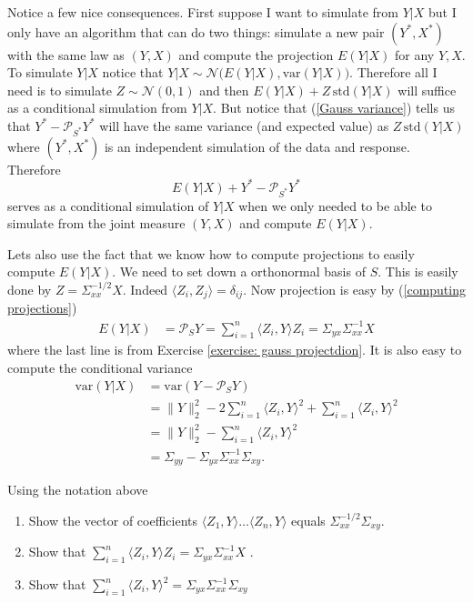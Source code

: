 Notice a few nice consequences. First suppose I want to simulate from $Y|X$ but I only have an algorithm that can do two things: simulate a new pair $(Y^*, X^*)$ with the same law as $(Y,X)$ and compute the projection $E(Y|X)$ for any $Y, X$. To simulate $Y|X$ notice that $Y|X\sim \mathcal N\bigl( E( Y|X), \text{var}(Y|X)\bigr)$. Therefore all I need is to simulate $ Z \sim \mathcal N(0,1)$ and then $E( Y|X) + Z\, \text{std}(Y|X)$ will suffice as a conditional simulation from $Y|X$. But notice that (\ref{Gauss variance}) tells us that $Y^* - \mathcal P_{S^*} Y^*$
 will have the same variance (and expected value) as $Z\, \text{std}(Y|X)$ where $(Y^*, X^*)$ is an independent simulation of the data and response. Therefore
 \[ E(Y|X) + Y^* - \mathcal P_{S^*} Y^*\]
 serves as a conditional simulation of $Y|X$ when we only needed to be able to simulate from the joint measure $(Y, X)$ and compute $E(Y|X)$.

 Lets also use the fact that we know how to compute projections to easily compute $E(Y|X)$. We need to set down a orthonormal basis of $S$. This is easily done by $Z = \Sigma_{xx}^{-1/2} X$. Indeed $\langle Z_i, Z_j\rangle = \delta_{ij}$. Now projection is easy by (\ref{computing projections})
 \begin{align*}
 E(Y|X) &= \mathcal P_SY = \sum_{i=1}^n \langle Z_i, Y\rangle Z_i = \Sigma_{yx} \Sigma_{xx}^{-1} X
 \end{align*}
 where the last line is from Exercise \ref{exercise: gauss projectdion}. It is also easy to compute the conditional variance
\begin{align*}
\text{var}(Y |X) &= \text{var}(Y -\mathcal P_S Y) \\
&= \| Y \|^2_2 - 2\sum_{i=1}^n \langle Z_i, Y\rangle^2 +  \sum_{i=1}^n \langle Z_i, Y\rangle^2 \\
&= \| Y \|^2_2 -  \sum_{i=1}^n \langle Z_i, Y\rangle^2 \\
&= \Sigma_{yy} - \Sigma_{yx} \Sigma_{xx}^{-1} \Sigma_{xy}.
\end{align*}


\begin{exercise}
\label{exercise: gauss projectdion}
Using the notation above
\begin{enumerate}
\item Show the vector of coefficients $\langle Z_1, Y\rangle \ldots \langle Z_n, Y\rangle$ equals $\Sigma_{xx}^{-1/2} \Sigma_{xy}$.
\item Show that  $\sum_{i=1}^n \langle Z_i, Y\rangle Z_i  = \Sigma_{yx} \Sigma_{xx}^{-1} X$ .
\item Show that $\sum_{i=1}^n \langle Z_i, Y\rangle^2 = \Sigma_{yx} \Sigma_{xx}^{-1} \Sigma_{xy}$
\end{enumerate}
\end{exercise}




